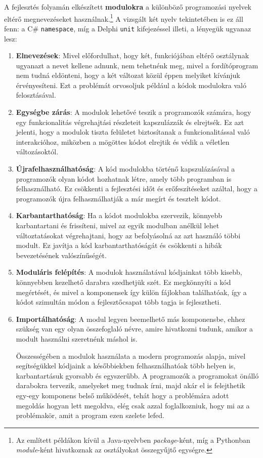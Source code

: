 \documentclass[tocnopagenum]{thesis-ekf}
\begin{document}
	A fejlesztés folyamán elkészített \textbf{modulokra} a különböző programozási nyelvek eltérő megnevezéseket használnak.\footnote{Az említett példákon kívül a Java-nyelvben \textit{package}-ként, míg a Pythonban \textit{module}-ként hivatkoznak az osztályokat összegyűjtő egységre.} A vizsgált két nyelv tekintetében is ez áll fenn: a C\# \verb|namespace|, míg a Delphi \verb|unit| kifejezéssel illeti, a lényegük ugyanaz lesz: 
	\begin{enumerate}
		\item \textbf{Elnevezések}: Mivel előfordulhat, hogy két, funkciójában eltérő osztálynak ugyanazt a nevet kellene adnunk, nem tehetnénk meg, mivel a fordítóprogram nem tudná eldönteni, hogy a két változat közül éppen melyiket kívánjuk érvényesíteni. Ezt a problémát orvosoljuk például a kódok modulokra való felosztásával.
		
		\item \textbf{Egységbe zárás}: A modulok lehetővé teszik a programozók számára, hogy egy funkcionalitás végrehajtási részleteit kapszulázzák és elrejtsék. Ez azt jelenti, hogy a modulok tiszta felületet biztosítanak a funkcionalitással való interakcióhoz, miközben a mögöttes kódot elrejtik és védik a véletlen változásoktól.
		
		\item \textbf{Újrafelhasználhatóság}: A kód modulokba történő kapszulázásával a programozók olyan kódot hozhatnak létre, amely több programban is felhasználható. Ez csökkenti a fejlesztési időt és erőfeszítéseket azáltal, hogy a programozók újra felhasználhatják a már megírt és tesztelt kódot.
		
		\item \textbf{Karbantarthatóság}: Ha a kódot modulokba szervezik, könnyebb karbantartani és frissíteni, mivel az egyik modulban anélkül lehet változtatásokat végrehajtani, hogy az befolyásolná az azt használó többi modult. Ez javítja a kód karbantarthatóságát és csökkenti a hibák bevezetésének valószínűségét.
		
		\item \textbf{Moduláris felépítés}: A modulok használatával kódjainkat több kisebb, könnyebben kezelhető darabra szedhetjük szét. Ez megkönnyíti a kód megértését, és mivel a komponensek így külön fájlokban találhatóak, így a kódot szimultán módon a fejlesztőcsapat több tagja is fejlesztheti.
		
		\item \textbf{Importálhatóság}: A modul legyen beemelhető más komponensbe, ehhez szükség van egy olyan összefoglaló névre, amire hivatkozni tudunk, amikor a modult használni szeretnénk máshol is.
		
		Összességében a modulok használata a modern programozás alapja, mivel segítségükkel kódjaink a későbbiekben felhasználhatóak több helyen is, karbantartásuk gyorsabb és egyszerűbb. A programozók a programokat önálló darabokra tervezik, amelyeket meg tudnak írni, majd akár el is felejthetik egy-egy komponens belső működését, tehát hogy a problémára adott megoldás hogyan lett megoldva, elég csak azzal foglalkozniuk, hogy mi az a problémakör, amit a program ezen szelete lefed. \cite{delphi_basics}
	\end{enumerate}
	
\end{document}
